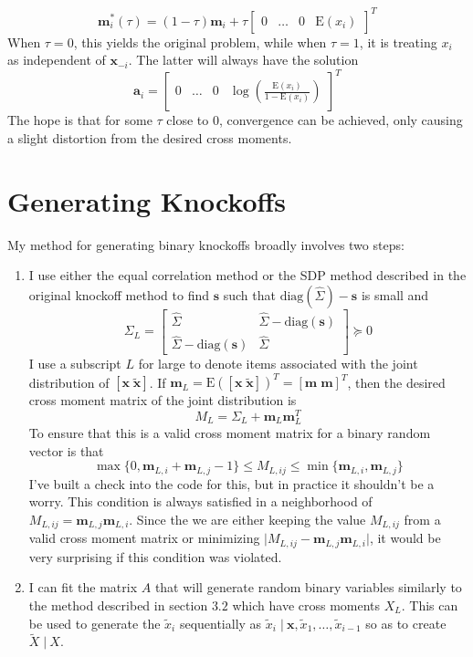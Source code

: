 \documentclass[11pt]{article}
\newcommand{\E}{\mathrm{E}}
\newcommand{\diag}{\mathrm{diag}}
\newcommand{\st}{ \; \big | \:}
\theoremstyle{definition}
\begin{document}
\begin{enumerate}
    \[\mathbf m_i^*(\tau) = (1-\tau)\mathbf m_i + \tau \left[ \begin{array}{cccc} 0 & \ldots & 0 & \E(x_i) \end{array} \right]^T \]
            When $\tau=0$, this yields the original problem, while when $\tau=1$, it is treating $x_i$ as independent of $\mathbf x_{-i}$. The latter will always have the solution
            \[\mathbf a_i = \left[ \begin{array}{cccc} 0 & \ldots & 0 & \log\left(\frac{\E(x_i)}{1-\E(x_i)}\right) \end{array} \right]^T \]
            The hope is that for some $\tau$ close to $0$, convergence can be achieved, only causing a slight distortion from the desired cross moments.
    \end{enumerate}

\section{Generating Knockoffs}
    My method for generating binary knockoffs broadly involves two steps:
    \begin{enumerate}
        \item I use either the equal correlation method or the SDP method described in the original knockoff method to find $\mathbf s$ such that $\diag(\hat\Sigma)-\mathbf s$ is small and 
        \[ \Sigma_L = \left[\begin{array}{cc}  \hat\Sigma & \hat\Sigma - \diag(\mathbf s )\\ \hat\Sigma - \diag(\mathbf s) & \hat\Sigma \end{array}\right] \succeq 0 \]
        I use a subscript $L$ for large to denote items associated with the joint distribution of $[\mathbf x \; \mathbf{\tilde x}]$. If $\mathbf m_L = \E\left([\mathbf x \; \mathbf{\tilde x}]\right)^T = [\mathbf m \; \mathbf m]^T$, then the desired cross moment matrix of the joint distribution is 
        \[ M_L = \Sigma_L + \mathbf m_L\mathbf m_L^T\]
        To ensure that this is a valid cross moment matrix for a binary random vector is that 
        \[\max\{0,\mathbf m_{L,i} + \mathbf m_{L,j} -1\} \leq M_{L,ij} \leq \min\{\mathbf m_{L,i}, \mathbf m_{L,j}\} \]
        I've built a check into the code for this, but in practice it shouldn't be a worry. This condition is always satisfied in a neighborhood of $M_{L,ij} = \mathbf m_{L,j}\mathbf m_{L,i}$. Since the we are either keeping the value $M_{L,ij}$ from a valid cross moment matrix or minimizing $\vert M_{L,ij} - \mathbf m_{L,j}\mathbf m_{L,i}\vert$, it would be very surprising if this condition was violated.
        
        \item I can fit the matrix $A$ that will generate random binary variables similarly to the method described in section $3.2$ which have cross moments $X_L$. This can be used to generate the $\tilde x_i$ sequentially as $\tilde x_i \st \mathbf x,\tilde x_1,\ldots,\tilde x_{i-1}$ so as to create $\tilde X \st X$. 
    \end{enumerate}
\end{document}
